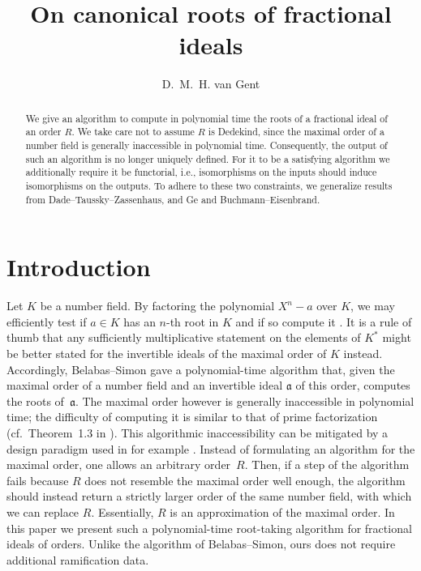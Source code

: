 \documentclass{amsart}
\title
[On canonical roots of fractional ideals]
{On canonical roots of fractional ideals}
\author[D.\ M.\ H. van Gent]{D.\ M.\ H. van Gent}
\theoremstyle{plain}
\theoremstyle{definition}
\begin{document}
\begin{abstract}
We give an algorithm to compute in polynomial time the roots of a fractional ideal of an order \(R\). 
We take care not to assume \(R\) is Dedekind, since the maximal order of a number field is generally inaccessible in polynomial time.
Consequently, the output of such an algorithm is no longer uniquely defined. For it to be a satisfying algorithm we additionally require it be functorial, i.e., isomorphisms on the inputs should induce isomorphisms on the outputs. To adhere to these two constraints, we generalize results from Dade--Taussky--Zassenhaus, and Ge and Buchmann--Eisenbrand.
\end{abstract}

\maketitle

\section{Introduction}

Let \(K\) be a number field. By factoring the polynomial \(X^n-a\) over \(K\), we may efficiently test if \(a\in K\) has an \(n\)-th root in \(K\) and if so compute it \cite{factoring_polynomials}.
It is a rule of thumb that any sufficiently multiplicative statement on the elements of \(K^*\) might be better stated for the invertible ideals of the maximal order of $K$ instead. %
Accordingly, Belabas--Simon \cite{Belabas} gave a polynomial-time algorithm that, given the maximal order of a number field and an invertible ideal \(\mathfrak{a}\) of this order, computes the roots of~\(\mathfrak{a}\).
The maximal order however is generally inaccessible in polynomial time; the difficulty of computing it is similar to that of prime factorization (cf.\ Theorem~1.3 in \cite{Buchman-Lenstra}).
This algorithmic inaccessibility can be mitigated by a design paradigm used in for example \cite{Buchman-Lenstra,Ge,Buchmann-Eisenbrand}.
Instead of formulating an algorithm for the maximal order, one allows an arbitrary order~\(R\).
Then, if a step of the algorithm fails because \(R\) does not resemble the maximal order well enough, the algorithm should instead return a strictly larger order of the same number field, with which we can replace \(R\).
Essentially, \(R\) is an approximation of the maximal order.
In this paper we present such a polynomial-time root-taking algorithm for fractional ideals of orders.
Unlike the algorithm of Belabas--Simon, ours does not require additional ramification data.
\end{document}
